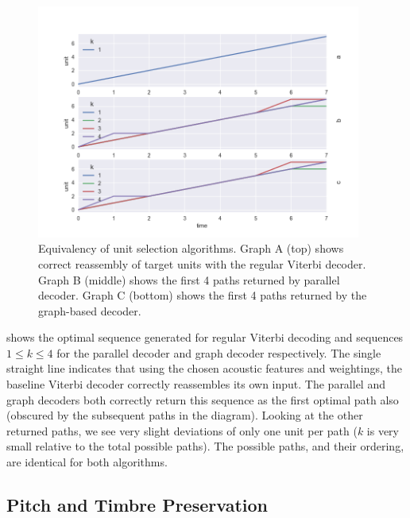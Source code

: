 {{{{{{{{\begin{figure}
	\begin{center}
		\includegraphics[width=0.95\textwidth]{ch05_pyconcat/figures/equivalence.png}
	\end{center}
	\caption[Equivalency of unit selection algorithms]{Equivalency of unit selection algorithms. Graph A (top) shows correct reassembly of target units with the regular Viterbi decoder. Graph B (middle) shows the first 4 paths returned by parallel decoder. Graph C (bottom) shows the first 4 paths returned by the graph-based decoder.}
	\label{fig:equivalency}
\end{figure}

 shows the optimal sequence generated for regular Viterbi decoding and sequences $1 \leq k \leq 4$ for the parallel decoder and graph decoder respectively. The single straight line indicates that using the chosen acoustic features and weightings, the baseline Viterbi decoder correctly reassembles its own input. The parallel and graph decoders both correctly return this sequence as the first optimal path also (obscured by the subsequent paths in the diagram). Looking at the other returned paths, we see very slight deviations of only one unit per path ($k$ is very small relative to the total possible paths). The possible paths, and their ordering, are identical for both algorithms.

\subsection{Pitch and Timbre Preservation}

}}}}}}}}
